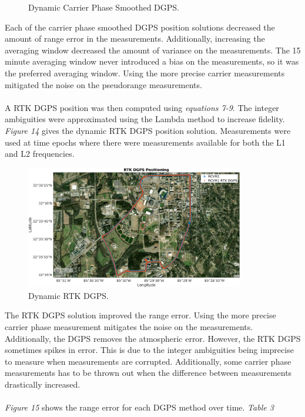 \documentclass[11pt]{article}
\begin{document}
\begin{enumerate}[label=\textbf{\arabic*.}]
\begin{figure}[H]
        \caption{Dynamic Carrier Phase Smoothed DGPS.}
      \end{figure}
      Each of the carrier phase smoothed DGPS position solutions decreased the amount of 
      range error in the measurements. Additionally, increasing the averaging window 
      decreased the amount of variance on the measurements. The 15 minute averaging 
      window never introduced a bias on the measurements, so it was the preferred averaging 
      window. Using the more precise carrier measurements mitigated the noise on the 
      pseudorange measurements. 
      \\ \\
      A RTK DGPS position was then computed using \emph{equations 7-9}. The integer 
      ambiguities were approximated using the Lambda method to increase fidelity. 
      \emph{Figure 14} gives the dynamic RTK DGPS position solution. Measurements were used 
      at time epochs where there were measurements available for both the L1 and L2 
      frequencies.
      \begin{figure}[H]
        \centering
        \includegraphics[width=0.85\textwidth]{p3_d.png}
        \caption{Dynamic RTK DGPS.}
      \end{figure}
      The RTK DGPS solution improved the range error. Using the more precise carrier phase 
      measurement mitigates the noise on the measurements. Additionally, the DGPS removes 
      the atmospheric error. However, the RTK DGPS sometimes spikes in error. This is due to 
      the integer ambiguities being imprecise to measure when measurements are corrupted. 
      Additionally, some carrier phase measurements has to be thrown out when the difference 
      between measurements drastically increased. 
      \\ \\
      \emph{Figure 15} shows the range error for each DGPS method over time. \emph{Table 3} 

\end{enumerate}
\end{document}
